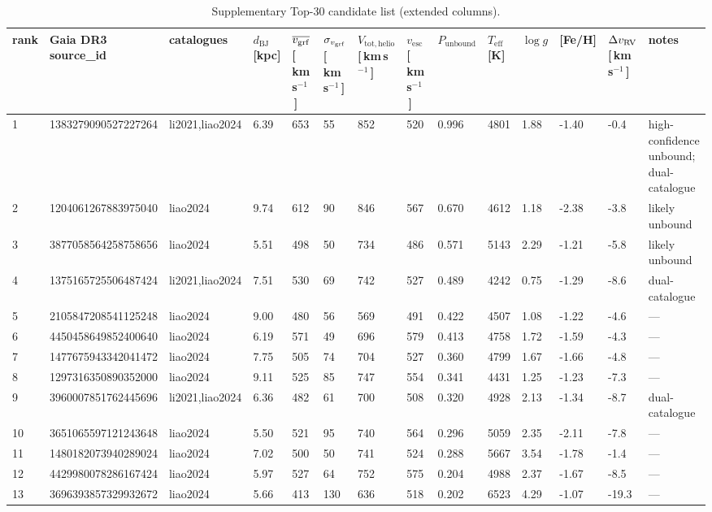 \begin{table}
\caption{Supplementary Top-30 candidate list (extended columns).}
\label{tab:top30supp}
\begin{tabular}{llllllllllllll}
\toprule
rank & Gaia DR3 source\_id & catalogues & $d_\mathrm{BJ}$ [kpc] & $\overline{v_{\rm grf}}$ [\,km\,s$^{-1}$\,] & $\sigma_{v_{\rm grf}}$ [\,km\,s$^{-1}$\,] & $V_\mathrm{tot,helio}$ [\,km\,s$^{-1}$\,] & $v_\mathrm{esc}$ [\,km\,s$^{-1}$\,] & $P_\mathrm{unbound}$ & $T_\mathrm{eff}$ [K] & $\log g$ & [Fe/H] & $\Delta v_{\rm RV}$ [\,km\,s$^{-1}$\,] & notes \\
\midrule
1 & 1383279090527227264 & li2021,liao2024 & 6.39 & 653 & 55 & 852 & 520 & 0.996 & 4801 & 1.88 & -1.40 & -0.4 & high-confidence unbound; dual-catalogue \\
2 & 1204061267883975040 & liao2024 & 9.74 & 612 & 90 & 846 & 567 & 0.670 & 4612 & 1.18 & -2.38 & -3.8 & likely unbound \\
3 & 3877058564258758656 & liao2024 & 5.51 & 498 & 50 & 734 & 486 & 0.571 & 5143 & 2.29 & -1.21 & -5.8 & likely unbound \\
4 & 1375165725506487424 & li2021,liao2024 & 7.51 & 530 & 69 & 742 & 527 & 0.489 & 4242 & 0.75 & -1.29 & -8.6 & dual-catalogue \\
5 & 2105847208541125248 & liao2024 & 9.00 & 480 & 56 & 569 & 491 & 0.422 & 4507 & 1.08 & -1.22 & -4.6 & --- \\
6 & 4450458649852400640 & liao2024 & 6.19 & 571 & 49 & 696 & 579 & 0.413 & 4758 & 1.72 & -1.59 & -4.3 & --- \\
7 & 1477675943342041472 & liao2024 & 7.75 & 505 & 74 & 704 & 527 & 0.360 & 4799 & 1.67 & -1.66 & -4.8 & --- \\
8 & 1297316350890352000 & liao2024 & 9.11 & 525 & 85 & 747 & 554 & 0.341 & 4431 & 1.25 & -1.23 & -7.3 & --- \\
9 & 3960007851762445696 & li2021,liao2024 & 6.36 & 482 & 61 & 700 & 508 & 0.320 & 4928 & 2.13 & -1.34 & -8.7 & dual-catalogue \\
10 & 3651065597121243648 & liao2024 & 5.50 & 521 & 95 & 740 & 564 & 0.296 & 5059 & 2.35 & -2.11 & -7.8 & --- \\
11 & 1480182073940289024 & liao2024 & 7.02 & 500 & 50 & 741 & 524 & 0.288 & 5667 & 3.54 & -1.78 & -1.4 & --- \\
12 & 4429980078286167424 & liao2024 & 5.97 & 527 & 64 & 752 & 575 & 0.204 & 4988 & 2.37 & -1.67 & -8.5 & --- \\
13 & 3696393857329932672 & liao2024 & 5.66 & 413 & 130 & 636 & 518 & 0.202 & 6523 & 4.29 & -1.07 & -19.3 & --- \\

\end{tabular}
\end{table}
